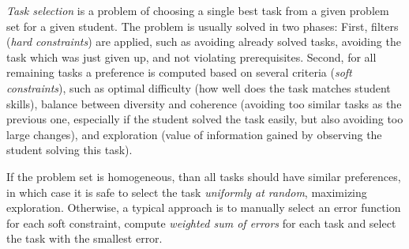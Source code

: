 \emph{Task selection} is a problem of choosing a single best task
from a given problem set for a given student.
The problem is usually solved in two phases:
First, filters (\emph{hard constraints}) are applied,
such as avoiding already solved
tasks, avoiding the task which was just given up, %
and not violating prerequisites.  %
Second, for all remaining tasks a preference is computed based on several criteria
(\emph{soft constraints}), such as
optimal difficulty (how well does the task matches student skills),
balance between diversity and coherence
(avoiding too similar tasks as the previous one, especially if the student
solved the task easily, but also avoiding too large changes),
and exploration (value of information gained by observing the student solving this task).

If the problem set is homogeneous, than all tasks should have similar preferences,
in which case it is safe to select the task \emph{uniformly at random},
maximizing exploration.
Otherwise, a typical approach is to manually select an error function for each
soft constraint, compute \emph{weighted sum of errors} for each task and
select the task with the smallest error.



